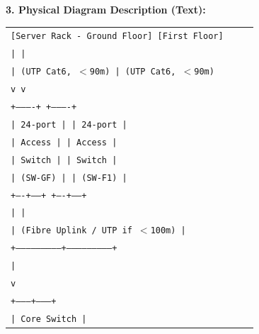 \documentclass[11pt]{article}
\begin{document}
\begin{exoresolu}
\textbf{3. Physical Diagram Description (Text):}
\begin{center}
\begin{tabular}{|p{0.9\linewidth}|}\hline
\texttt{[Server Rack - Ground Floor] \hspace{2cm} [First Floor]}\\
\texttt{\hspace{0.5cm}| \hspace{4.5cm} |}\\
\texttt{\hspace{0.5cm}| (UTP Cat6, $<$90m) \hspace{2cm} | (UTP Cat6, $<$90m)}\\
\texttt{\hspace{0.5cm}v \hspace{4.5cm} v}\\
\texttt{+----------+ \hspace{2cm} +----------+}\\
\texttt{| 24-port  | \hspace{2cm} | 24-port  |}\\
\texttt{| Access   | \hspace{2cm} | Access   |}\\
\texttt{| Switch   | \hspace{2cm} | Switch   |}\\
\texttt{| (SW-GF)  | \hspace{2cm} | (SW-F1)  |}\\
\texttt{+----+-----+ \hspace{2cm} +----+-----+}\\
\texttt{\hspace{0.5cm}| \hspace{4.5cm} |}\\
\texttt{\hspace{0.5cm}| (Fibre Uplink / UTP if $<$100m) \hspace{1.5cm} |}\\
\texttt{\hspace{0.5cm}+---------------------------+---------------------------+}\\
\texttt{\hspace{3.5cm}|}\\
\texttt{\hspace{3.5cm}v}\\
\texttt{\hspace{2cm}+--------+--------+}\\
\texttt{\hspace{2cm}|  Core Switch    |}\\

\end{tabular}
\end{center}
\end{exoresolu}
\end{document}
